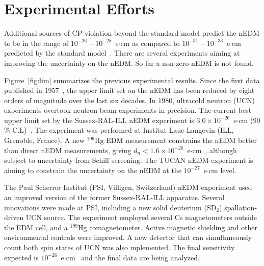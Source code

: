 \section{Experimental Efforts}\label{sec:lim}

Additional sources of CP violation beyond the standard model predict the nEDM to be in the range of $10^{-26}$ -- $10^{-28}$~e$\cdot$cm as compared to $10^{-31}$ -- $10^{-33}$~e$\cdot$cm predicted by the standard model~\cite{theory_lim_1, theory_lim_2, theory_lim_3}. There are several experiments aiming at improving the uncertainty on the nEDM. So far a non-zero nEDM is not found.


Figure~\ref{fig:lim} summarizes the previous experimental results. Since the first data published in 1957~\cite{1_lim}, the upper limit set on the nEDM has been reduced by eight orders of magnitude over the last six decades. In 1980, ultracold neutron (UCN) experiments overtook neutron beam experiments in precision. The current best upper limit set by the Sussex-RAL-ILL nEDM experiment is $3.0 \times 10^{-26}$~e$\cdot$cm (90 \% C.L)~\cite{bestLim_1,bestLim_2}. The experiment was performed at Institut Laue-Langevin (ILL, Grenoble, France). A new $^{199}\mathrm{Hg}$ EDM measurement constrains the nEDM better than direct nEDM measurements, giving $d_n<\mathrm{1.6\times10^{-26}}$~e$\cdot$cm~\cite{schiff_screen}, although subject to uncertainty from Schiff screening.  The TUCAN nEDM experiment is aiming to constrain the uncertainty on the nEDM at the $10^{-27}$~e$\cdot$cm level. 



The Paul Scherrer Institut (PSI, Villigen, Switzerland) nEDM experiment used an improved version of the former Sussex-RAL-ILL apparatus. Several innovations were made at PSI, including a new solid deuterium ($\mathrm{SD_2}$) spallation-driven UCN source. The experiment employed several Cs magnetometers outside the EDM cell, and a $^{199}\mathrm{Hg}$ comagnetometer. Active magnetic shielding and other environmental controls were improved. A new detector that can simultaneously count both spin states of UCN was also mplemented. The final sensitivity expected is $\mathrm{10^{-26}}$~e$\cdot$cm~\cite{psi} and the final data are being analyzed. 

